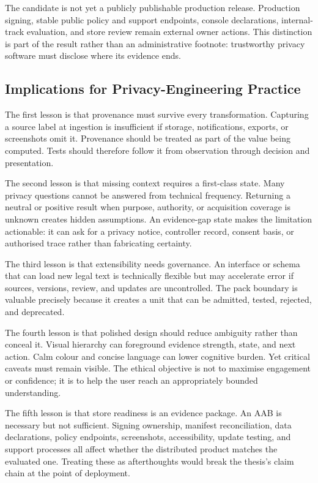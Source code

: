 The candidate is not yet a publicly publishable production release. Production signing, stable public policy and support endpoints, console declarations, internal-track evaluation, and store review remain external owner actions. This distinction is part of the result rather than an administrative footnote: trustworthy privacy software must disclose where its evidence ends.

\subsection{Implications for Privacy-Engineering Practice}

The first lesson is that provenance must survive every transformation. Capturing a source label at ingestion is insufficient if storage, notifications, exports, or screenshots omit it. Provenance should be treated as part of the value being computed. Tests should therefore follow it from observation through decision and presentation.

The second lesson is that missing context requires a first-class state. Many privacy questions cannot be answered from technical frequency. Returning a neutral or positive result when purpose, authority, or acquisition coverage is unknown creates hidden assumptions. An evidence-gap state makes the limitation actionable: it can ask for a privacy notice, controller record, consent basis, or authorised trace rather than fabricating certainty.

The third lesson is that extensibility needs governance. An interface or schema that can load new legal text is technically flexible but may accelerate error if sources, versions, review, and updates are uncontrolled. The pack boundary is valuable precisely because it creates a unit that can be admitted, tested, rejected, and deprecated.

The fourth lesson is that polished design should reduce ambiguity rather than conceal it. Visual hierarchy can foreground evidence strength, state, and next action. Calm colour and concise language can lower cognitive burden. Yet critical caveats must remain visible. The ethical objective is not to maximise engagement or confidence; it is to help the user reach an appropriately bounded understanding.

The fifth lesson is that store readiness is an evidence package. An AAB is necessary but not sufficient. Signing ownership, manifest reconciliation, data declarations, policy endpoints, screenshots, accessibility, update testing, and support processes all affect whether the distributed product matches the evaluated one. Treating these as afterthoughts would break the thesis's claim chain at the point of deployment.

